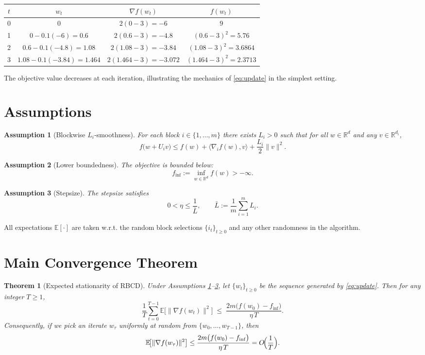 \documentclass{article}
\newtheorem{theorem}{Theorem}
\newtheorem{assumption}{Assumption}
\newcommand{\E}{\mathbb{E}}
\newcommand{\R}{\mathbb{R}}
\begin{document}
\begin{center}
\begin{tabular}{c|c|c|c}
$t$ & $w_t$ & $\nabla f(w_t)$ & $f(w_t)$ \\ \hline
0 & $0$ & $2(0-3)=-6$ & $9$ \\
1 & $0-0.1(-6)=0.6$ & $2(0.6-3)=-4.8$ & $(0.6-3)^2=5.76$ \\
2 & $0.6-0.1(-4.8)=1.08$ & $2(1.08-3)=-3.84$ & $(1.08-3)^2=3.6864$ \\
3 & $1.08-0.1(-3.84)=1.464$ & $2(1.464-3)=-3.072$ & $(1.464-3)^2=2.3713$ \\
\end{tabular}
\end{center}
The objective value decreases at each iteration, illustrating the mechanics of \eqref{eq:update} in the simplest setting.

\newpage
\section*{Assumptions}
\begin{assumption}[Blockwise $L_i$‑smoothness]\label{ass:smooth}
For each block $i\in\{1,\dots,m\}$ there exists $L_i>0$ such that for all 
$w\in\R^{d}$ and any $v\in\R^{d_i}$,
\[
f\bigl(w+U_i v\bigr)\le 
f(w)+\langle \nabla_i f(w),v\rangle+\frac{L_i}{2}\|v\|^{2}.
\]
\end{assumption}
\begin{assumption}[Lower boundedness]\label{ass:lb}
The objective is bounded below:
\[
f_{\inf}:=\inf_{w\in\R^{d}} f(w)>-\infty .
\]
\end{assumption}
\begin{assumption}[Stepsize]\label{ass:stepsize}
The stepsize satisfies
\[
0<\eta\le \frac{1}{\bar L},\qquad 
\bar L:=\frac{1}{m}\sum_{i=1}^{m}L_i .
\]
\end{assumption}

All expectations $\E[\cdot]$ are taken w.r.t. the random block selections
$\{i_t\}_{t\ge0}$ and any other randomness in the algorithm.

\section*{Main Convergence Theorem}
\begin{theorem}[Expected stationarity of RBCD]\label{thm:main}
Under Assumptions \ref{ass:smooth}–\ref{ass:stepsize}, let $\{w_t\}_{t\ge0}$ be the sequence generated by \eqref{eq:update}. Then for any integer $T\ge1$,
\begin{equation}
\label{eq:rate}
\frac{1}{T}\sum_{t=0}^{T-1}\E\!\bigl[\|\nabla f(w_t)\|^{2}\bigr]
\;\le\;
\frac{2m\bigl(f(w_{0})-f_{\inf}\bigr)}{\eta\,T}.
\end{equation}
Consequently, if we pick an iterate $w_{\tau}$ uniformly at random from 
$\{w_0,\dots,w_{T-1}\}$, then
\[
\E\!\bigl[\|\nabla f(w_{\tau})\|^{2}\bigr]\le
\frac{2m\bigl(f(w_{0})-f_{\inf}\bigr)}{\eta\,T}=O\!\Bigl(\frac{1}{T}\Bigr).
\]
\end{theorem}
\end{document}
